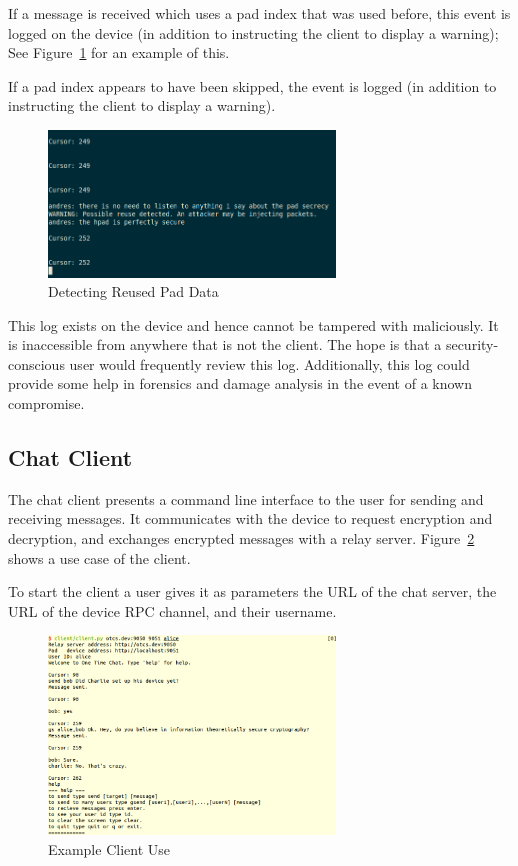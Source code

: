 \documentclass[twocolumn]{article}
\begin{document}
If a message is received which uses a pad index that was used before,
this event is logged on the device (in addition to instructing the client
to display a warning); See Figure~\ref{fig:reuse} for an example of this.

If a pad index appears to have been skipped, the event is logged (in addition to instructing the client to display a warning).

\begin{figure}[htp]
\centering
\includegraphics[width=3in]{reuse}
\caption{Detecting Reused Pad Data}
\label{fig:reuse}
\end{figure}

This log exists on the device and hence cannot be tampered with maliciously. It is inaccessible from anywhere that is not the client.
The hope is that a security-conscious user would frequently review this log. Additionally, this log could provide some help in forensics
and damage analysis in the event of a known compromise.

\subsection{Chat Client}
\label{sec:client}

The chat client presents a command line interface to the user for sending and receiving messages. It communicates with the device to request encryption and decryption, and exchanges encrypted messages with a relay server. Figure~\ref{fig:clientexample} shows a use case of the client.

To start the client a user gives it as parameters the URL of the chat server, the URL of the device RPC channel, and their username.

\begin{figure}[htp]
\centering
\includegraphics[width=3in]{sample}
\caption{Example Client Use}
\label{fig:clientexample}
\end{figure}
\end{document}

